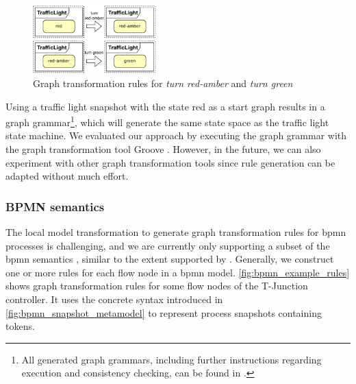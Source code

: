 \documentclass{jot}
\begin{document}
\begin{figure}[h]
    \centering
    \includegraphics[width=0.425\textwidth]{figures/sm_rules.pdf}
    \caption{Graph transformation rules for \emph{turn red-amber} and \emph{turn green}}
    \label{fig:sm_rules}
\end{figure}

Using a traffic light snapshot with the state red as a start graph results in a graph grammar\footnote{\label{footnote:GGinRepo}All generated graph grammars, including further instructions regarding execution and consistency checking, can be found in \cite{krauterArtifactsBehavioralConsistency2022}.}, which will generate the same state space as the traffic light state machine.
We evaluated our approach by executing the graph grammar with the graph transformation tool Groove \cite{ghamarianModellingAnalysisUsing2012, rensinkGROOVESimulatorTool2004}.
However, in the future, we can also experiment with other graph transformation tools since rule generation can be adapted without much effort.

\subsubsection{BPMN semantics}
The local model transformation to generate graph transformation rules for \gls*{bpmn} processes is challenging, and we are currently only supporting a subset of the \gls*{bpmn} semantics \cite{krauterFormalizationAnalysisBPMN2022}, similar to the extent supported by \cite{vangorpVisualTokenbasedFormalization2013}.
Generally, we construct one or more rules for each flow node in a \gls*{bpmn} model.
\autoref{fig:bpmn_example_rules} shows graph transformation rules for some flow nodes of the T-Junction controller.
It uses the concrete syntax introduced in \cref{fig:bpmn_snapshot_metamodel} to represent process snapshots containing tokens.
\end{document}
